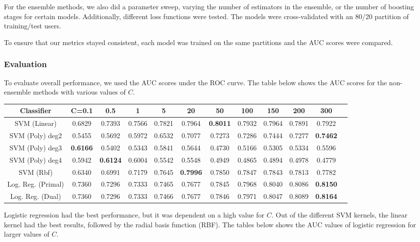 \documentclass{article} %
\begin{document}
For the ensemble methods, we also did a parameter sweep, varying the number of estimators in the ensemble, or the number of boosting stages for certain models.
Additionally, different loss functions were tested.
The models were cross-validated with an 80/20 partition of training/test users.

To ensure that our metrics stayed consistent, each model was trained on the same partitions and the AUC scores were compared.

\subsubsection{Evaluation}

To evaluate overall performance, we used the AUC scores under the ROC curve.
The table below shows the AUC scores for the non-ensemble methods with various values of $C$.

\begin{adjustbox}{width=\textwidth,totalheight=\textheight,keepaspectratio}
\begin{tabular}{c|ccccccccccc}
Classifier & C=0.1 & 0.5 & 1 & 5 & 20 & 50 & 100 & 150 & 200 & 300\\
\hline
SVM (Linear) & 0.6829 & 0.7393 & 0.7566 & 0.7821 & 0.7964 & \textbf{0.8011} & 0.7932 & 0.7964 & 0.7891 & 0.7922\\
SVM (Poly) deg2 & 0.5455 & 0.5692 & 0.5972 & 0.6532 & 0.7077 & 0.7273 & 0.7286 & 0.7444 & 0.7277 & \textbf{0.7462}\\
SVM (Poly) deg3 & \textbf{0.6166} & 0.5402 & 0.5343 & 0.5841 & 0.5644 & 0.4730 & 0.5166 & 0.5305 & 0.5334 & 0.5596\\
SVM (Poly) deg4 & 0.5942 & \textbf{0.6124} & 0.6004 & 0.5542 & 0.5548 & 0.4949 & 0.4865 & 0.4894 & 0.4978 & 0.4779\\
SVM (Rbf) & 0.6340 & 0.6991 & 0.7179 & 0.7645 & \textbf{0.7996} & 0.7850 & 0.7847 & 0.7843 & 0.7813 & 0.7782\\
Log. Reg. (Primal) & 0.7360 & 0.7296 & 0.7333 & 0.7465 & 0.7677 & 0.7845 & 0.7968 & 0.8040 & 0.8086 & \textbf{0.8150}\\
Log. Reg. (Dual) & 0.7360 & 0.7296 & 0.7333 & 0.7466 & 0.7677 & 0.7846 & 0.7971 & 0.8047 & 0.8089 & \textbf{0.8164}\\
\end{tabular}
\end{adjustbox}

Logistic regression had the best performance, but it was dependent on a high value for $C$.
Out of the different SVM kernels, the linear kernel had the best results, followed by the radial basis function (RBF).
The tables below shows the AUC values of logistic regression for larger values of $C$.
\end{document}
